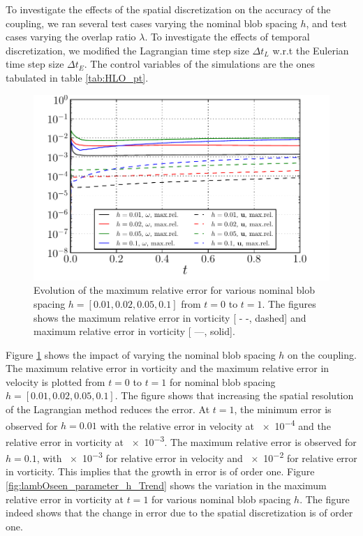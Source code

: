 To investigate the effects of the spatial discretization on the accuracy of the coupling, we ran several test cases varying the nominal blob spacing $h$, and test cases varying the overlap ratio $\lambda$. To investigate the effects of temporal discretization, we modified the Lagrangian time step size $\Delta t_L$ w.r.t the Eulerian time step size $\Delta t_E$. The control variables of the simulations are the ones tabulated in table \ref{tab:HLO_pt}.

	\begin{figure}[!b]
	\centering
	\includegraphics[width=0.6\linewidth]{./figures/validation/lambOseen/lambOseen_parameter_h.pdf}
	\caption{Evolution of the maximum relative error for various nominal blob spacing $h = [0.01,0.02,0.05,0.1]$ from $t=0$ to $t=1$. The figures shows the maximum relative error in vorticity [ - -, dashed] and maximum relative error in vorticity [ ---, solid].}
	\label{fig:lambOseen_parameter_h}
	\end{figure}	
	
Figure \ref{fig:lambOseen_parameter_h} shows the impact of varying the nominal blob spacing $h$ on the coupling. The maximum relative error in vorticity and the maximum relative error in velocity is plotted from $t=0$ to $t=1$ for nominal blob spacing $h = [0.01,0.02,0.05,0.1]$. The figure shows that increasing the spatial resolution of the Lagrangian method reduces the error. At $t=1$, the minimum error is observed for $h=0.01$ with the relative error in velocity at \num{e-4} and the relative error in vorticity at \num{e-3}. The maximum relative error is observed for $h=0.1$, with \num{e-3} for relative error in velocity and \num{e-2} for relative error in vorticity. This implies that the growth in error is of order one. Figure \ref{fig:lambOseen_parameter_h_Trend} shows the variation in the maximum relative error in vorticity at $t=1$ for various nominal blob spacing $h$. The figure indeed shows that the change in error due to the spatial discretization is of order one.

